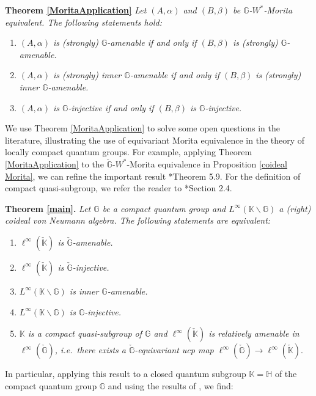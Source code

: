 \documentclass[reqno]{amsart}
\numberwithin{equation}{section}
\newcommand{\G}{\mathbb{G}}
\begin{document}
\textbf{Theorem \ref{MoritaApplication}} \textit{Let $(A, \alpha)$ and $(B, \beta)$ be $\G$-$W^*$-Morita equivalent. The following statements hold:}
    \begin{enumerate}\setlength\itemsep{-0.5em}
        \item \textit{$(A, \alpha)$ is (strongly) $\G$-amenable if and only if $(B, \beta)$ is (strongly) $\G$-amenable.}
\item \textit{$(A, \alpha)$ is (strongly) inner $\G$-amenable if and only if $(B, \beta)$ is (strongly) inner $\G$-amenable.}
\item \textit{$(A, \alpha)$ is $\G$-injective if and only if $(B, \beta)$ is $\G$-injective.}
\end{enumerate}

We use Theorem \ref{MoritaApplication} to solve some open questions in the literature, illustrating the use of equivariant Morita equivalence in the theory of locally compact quantum groups. For example, applying Theorem \ref{MoritaApplication} to the $\check{\G}$-$W^*$-Morita equivalence in Proposition \ref{coideal Morita}, we can refine the important result \cite{AK24}*{Theorem 5.9}. For the definition of compact quasi-subgroup, we refer the reader to \cite{AK24}*{Section 2.4}.

\textbf{Theorem \ref{main}.} \textit{Let $\G$ be a compact quantum group and $L^\infty(\mathbb{K}\backslash \G)$ a (right) coideal von Neumann algebra. The following statements are equivalent:}
\begin{enumerate}\setlength\itemsep{-0.5em}
    \item \textit{$\ell^\infty(\check{\mathbb{K}})$ is $\check{\G}$-amenable.}
    \item \textit{$\ell^\infty(\check{\mathbb{K}})$ is $\check{\G}$-injective.}
    \item \textit{$L^\infty(\mathbb{K}\backslash \G)$ is inner $\G$-amenable.}
    \item \textit{$L^\infty(\mathbb{K}\backslash \G)$ is $\G$-injective.}
    \item \textit{$\mathbb{K}$ is a compact quasi-subgroup of $\G$ and $\ell^\infty(\check{\mathbb{K}})$ is relatively amenable in $\ell^\infty(\check{\G})$, i.e.\ there exists a $\check{\G}$-equivariant ucp map $\ell^\infty(\check{\G})\to \ell^\infty(\check{\mathbb{K}}).$}
\end{enumerate}

In particular, applying this result to a closed quantum subgroup $\mathbb{K}= \mathbb{H}$ of the compact quantum group $\G$ and using the results of \cite{AK24}, we find:
\end{document}
